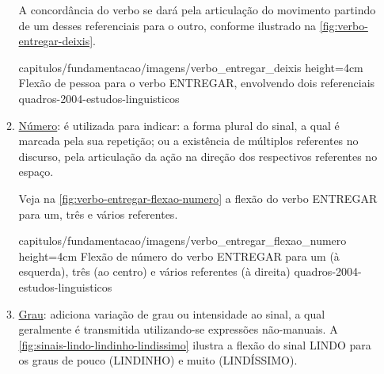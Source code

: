 \begin{enumerate}
\begin{enumerate}
                    A concordância do verbo se dará pela articulação do movimento partindo de um desses referenciais para o outro, conforme ilustrado na \autoref{fig:verbo-entregar-deixis}.


                    {capitulos/fundamentacao/imagens/verbo_entregar_deixis} %
                    {height=4cm} %
                    {Flexão de pessoa para o verbo ENTREGAR, envolvendo dois referenciais} %
                    {quadros-2004-estudos-linguisticos} %


              \item \underline{Número}: é utilizada para indicar: a forma plural do sinal, a qual é marcada pela sua repetição; ou a existência de múltiplos referentes no discurso, pela articulação da ação na direção dos respectivos referentes no espaço.

                    Veja na \autoref{fig:verbo-entregar-flexao-numero} a flexão do verbo ENTREGAR para um, três e vários referentes.


                    {capitulos/fundamentacao/imagens/verbo_entregar_flexao_numero} %
                    {height=4cm} %
                    {Flexão de número do verbo ENTREGAR para um (à esquerda), três (ao centro) e vários referentes (à direita)} %
                    {quadros-2004-estudos-linguisticos} %


              \item \underline{Grau}: adiciona variação de grau ou intensidade ao sinal, a qual geralmente é transmitida utilizando-se expressões não-manuais.
                    A \autoref{fig:sinais-lindo-lindinho-lindissimo} ilustra a flexão do sinal LINDO para os graus de pouco (LINDINHO) e muito (LINDÍSSIMO).


\end{enumerate}
\end{enumerate}
